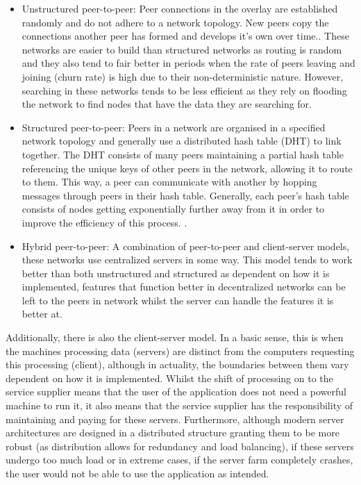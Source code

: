 \documentclass[]{report}
\begin{document}
	\begin{itemize}
		\item Unstructured peer-to-peer:
		Peer connections in the overlay are established randomly and do not adhere to a network topology. New peers copy the connections another peer has formed and develops it's own over time.\cite{P2P overlay networks}. These networks are easier to build than structured networks as routing is random and they also tend to fair better in periods when the rate of peers leaving and joining (churn rate) is high due to their non-deterministic nature. However, searching in these networks tends to be less efficient as they rely on flooding the network to find nodes that have the data they are searching for.
		\item Structured peer-to-peer:
		Peers in a network are organised in a specified network topology and generally use a distributed hash table (DHT) to link together. The DHT consists of many peers maintaining a partial hash table referencing the unique keys of other peers in the network, allowing it to route to them. This way, a peer can communicate with another by hopping messages through peers in their hash table. Generally, each peer's hash table consists of nodes getting exponentially further away from it in order to improve the efficiency of this process. \cite{P2P overlay networks}. 
		\item Hybrid peer-to-peer:
		A combination of  peer-to-peer and client-server models, these networks use centralized servers in some way.  This model tends to work better than both unstructured and structured as dependent on how it is implemented, features that function better in decentralized networks can be left to the peers in network whilst the server can handle the features it is better at. \cite{Hybrid P2P network}
	\end{itemize}
				
	Additionally, there is also the client-server model. In a basic sense, this is when the machines processing data (servers) are distinct from the computers requesting this processing (client), although in actuality, the boundaries between them vary dependent on how it is implemented. Whilst the shift of processing on to the service supplier means that the user of the application does not need a powerful machine to run it, it also means that the service supplier has the responsibility of maintaining and paying for these servers. Furthermore, although modern server architectures are designed in a distributed structure granting them to be more robust (as distribution allows for redundancy and load balancing), if these servers undergo too much load or in extreme cases, if the server farm completely crashes, the user would not be able to use the application as intended.
	
\end{document}
